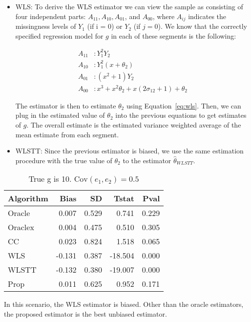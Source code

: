 \documentclass[12pt]{article}
\newcommand{\Cov}{{\text{Cov}}}
\begin{document}
\begin{itemize}
\begin{itemize}
      \item WLS: To derive the WLS estimator we can view the sample as 
        consisting of four independent parts: $A_{11}, A_{10}, A_{01}$, and 
        $A_{00}$, where $A_{ij}$ indicates the missingness levels of $Y_1$ (if 
        i = 0) or $Y_2$ (if $j = 0$). We know that the correctly specified
        regression model for $g$ in each of these segments is the following:

        \begin{align*}
          A_{11}&: Y_1^2 Y_2 \\
          A_{10}&: Y_1^2  (x + \theta_2) \\
          A_{01}&: (x^2 + 1) Y_2\\
          A_{00}&: x^3 + x^2 \theta_2 + x(2\sigma_{12} + 1) + \theta_2
        \end{align*}

        The estimator is then to estimate $\theta_2$ using Equation~\ref{eq:wls}.
        Then, we can plug in the estimated value of $\theta_2$ into the previous 
        equations to get estimates of $g$. The overall estimate is the estimated 
        variance weighted average of the mean estimate from each segment.

      \item WLSTT: Since the previous estimator is biased, we use the same
        estimation procedure with the true value of $\theta_2$ to the estimator 
        $\hat \theta_{WLSTT}$.
     \end{itemize}

     \begin{table}[!ht]
       \caption{True g is 10. $\Cov(e_1, e_2) = 0.5$}
       \centering
       \begin{tabular}[t]{lrrrr}
         \toprule
         Algorithm & Bias & SD & Tstat & Pval\\
         \midrule
         Oracle & 0.007 & 0.529 & 0.741 & 0.229\\
         Oraclex & 0.004 & 0.475 & 0.510 & 0.305\\
         CC & 0.023 & 0.824 & 1.518 & 0.065\\
         WLS & -0.131 & 0.387 & -18.504 & 0.000\\
         WLSTT & -0.132 & 0.380 & -19.007 & 0.000\\
         Prop & 0.011 & 0.625 & 0.952 & 0.171\\
         \bottomrule
       \end{tabular}
     \end{table}

     In this scenario, the WLS estimator is biased. Other than the oracle 
     estimators, the proposed estimator is the best unbiased estimator.

\end{itemize}
\end{document}
